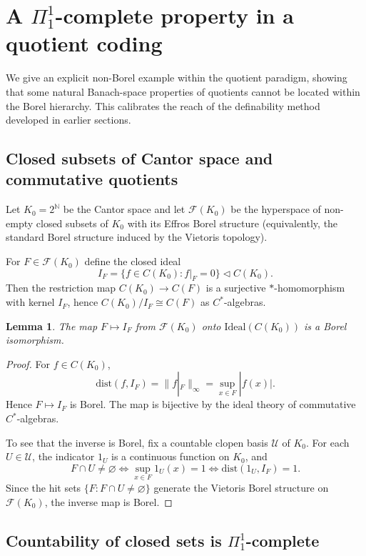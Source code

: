 \documentclass[12pt,fleqn,a4paper]{amsart}
\numberwithin{equation}{section}
\newtheorem{lemma}[theorem]{Lemma}
\theoremstyle{definition}
\newcommand{\N}{\mathbb{N}}
\newcommand{\Ideal}{\mathrm{Ideal}}
\newcommand{\dist}{\mathrm{dist}}
\begin{document}
\section{A \texorpdfstring{$\Pi^1_1$}{Pi11}-complete property in a quotient coding}\label{sec:Pi11-example}

We give an explicit non-Borel example within the quotient paradigm, showing that some
natural Banach-space properties of quotients cannot be located within the Borel
hierarchy.  This calibrates the reach of the definability method developed in earlier
sections.

\subsection{Closed subsets of Cantor space and commutative quotients}

Let $K_0=2^\N$ be the Cantor space and let $\mathscr F(K_0)$ be the hyperspace of
non-empty closed subsets of $K_0$ with its Effros Borel structure (equivalently, the
standard Borel structure induced by the Vietoris topology).

For $F\in\mathscr F(K_0)$ define the closed ideal
\[
I_F=\{f\in C(K_0): f|_F=0\}\triangleleft C(K_0).
\]
Then the restriction map $C(K_0)\to C(F)$ is a surjective $*$-homomorphism with kernel
$I_F$, hence $C(K_0)/I_F\cong C(F)$ as $C^*$-algebras.

\begin{lemma}\label{lem:F-to-I-borel}
The map $F\mapsto I_F$ from $\mathscr F(K_0)$ onto $\Ideal(C(K_0))$ is a
Borel isomorphism.
\end{lemma}

\begin{proof}
For $f\in C(K_0)$,
\[
\dist(f,I_F)=\|f|_F\|_\infty=\sup_{x\in F}|f(x)|.
\]
Hence $F\mapsto I_F$ is Borel.  The map is bijective by the ideal theory of
commutative $C^*$-algebras.

To see that the inverse is Borel, fix a countable clopen basis
$\mathcal U$ of $K_0$.  For each $U\in\mathcal U$, the indicator $1_U$ is a
continuous function on $K_0$, and
\[
F\cap U\neq\varnothing
\iff
\sup_{x\in F}1_U(x)=1
\iff
\dist(1_U,I_F)=1.
\]
Since the hit sets $\{F:F\cap U\neq\varnothing\}$ generate the Vietoris
Borel structure on $\mathscr F(K_0)$, the inverse map is Borel.
\end{proof}

\subsection{Countability of closed sets is \texorpdfstring{$\Pi^1_1$}{Pi11}-complete}
\end{document}
